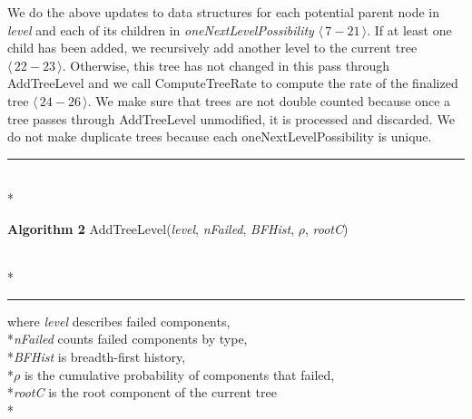\documentclass[12pt]{article}
\newcommand{\captionAmerica}[2]{\noindent\hrLine\vspace{-0.25em}\\*{\raggedright\textbf{Algorithm #1} #2}\vspace{-0.8em}\\*\hrLine}
\newcommand{\hrLine}{\hspace{\fill}\rule{1.0\linewidth}{.7pt}\hspace{\fill}}
\newcommand{\varName}[1]{\textrm{\it#1}}
\newcommand{\citeBlock}[2]{$\langle\,#1 - #2\,\rangle$}
\begin{document}
We do the above updates to data structures for each potential parent node in \varName{level} and each of its children in \varName{oneNextLevelPossibility} \citeBlock{7}{21}. If at least one child has been added, we recursively add another level to the current tree \citeBlock{22}{23}. Otherwise, this tree has not changed in this pass through AddTreeLevel and we call ComputeTreeRate to compute the rate of the finalized tree \citeBlock{24}{26}. We make sure that trees are not double counted because once a tree passes through AddTreeLevel unmodified, it is processed and discarded. We do not make duplicate trees because each oneNextLevelPossibility is unique.

\captionAmerica{2}{AddTreeLevel(\varName{level}, \varName{nFailed}, \varName{BFHist}, $\rho$, \varName{rootC})}
where \varName{level} describes failed components, \\*\varName{nFailed} counts failed components by type, \\*\varName{BFHist} is breadth-first history, \\*$\rho$ is the cumulative probability of components that failed, \\*\varName{rootC} is the root component of the current tree
\\*\vspace{0.8em}
\end{document}
